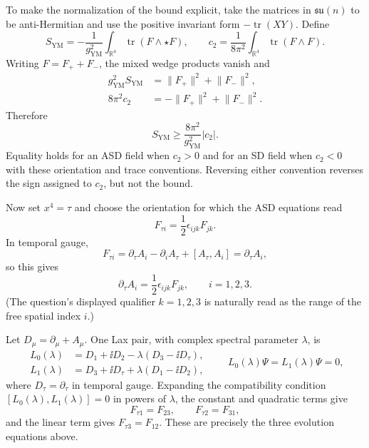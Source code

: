 \begin{enumerate}
  To make the normalization of the bound explicit, take the matrices in
  \(\mathfrak{su}(n)\) to be anti-Hermitian and use the positive
  invariant form \(-\operatorname{tr}(XY)\).  Define
  \[
    S_{\mathrm{YM}}
      =-\frac1{g_{\mathrm{YM}}^2}
        \int_{\mathbb R^4}\operatorname{tr}(F\wedge\star F),
    \qquad
    c_2=\frac1{8\pi^2}
        \int_{\mathbb R^4}\operatorname{tr}(F\wedge F).
  \]
  Writing \(F=F_++F_-\), the mixed wedge products vanish and
  \[
  \begin{split}
    g_{\mathrm{YM}}^2S_{\mathrm{YM}}
      &=\lVert F_+\rVert^2+\lVert F_-\rVert^2,\\
    8\pi^2c_2
      &=-\lVert F_+\rVert^2+\lVert F_-\rVert^2.
  \end{split}
  \]
  Therefore
  \[
    \boxed{S_{\mathrm{YM}}
      \geq\frac{8\pi^2}{g_{\mathrm{YM}}^2}|c_2|.}
  \]
  Equality holds for an ASD field when \(c_2>0\) and for an SD field
  when \(c_2<0\) with these orientation and trace conventions.  Reversing
  either convention reverses the sign assigned to \(c_2\), but not the
  bound.

  Now set \(x^4=\tau\) and choose the orientation for which the ASD
  equations read
  \[
    F_{\tau i}=\frac12\epsilon_{ijk}F_{jk}.
  \]
  In temporal gauge,
  \[
    F_{\tau i}=\partial_\tau A_i
      -\partial_iA_\tau+[A_\tau,A_i]
      =\partial_\tau A_i,
  \]
  so this gives
  \[
    \boxed{\partial_\tau A_i
      =\frac12\epsilon_{ijk}F_{jk},\qquad i=1,2,3.}
  \]
  (The question's displayed qualifier \(k=1,2,3\) is naturally read as
  the range of the free spatial index \(i\).)

  Let \(D_\mu=\partial_\mu+A_\mu\).  One Lax pair, with complex spectral
  parameter \(\lambda\), is
  \[
  \begin{split}
    L_0(\lambda)
      &=D_1+\ii D_2-\lambda(D_3-\ii D_\tau),\\
    L_1(\lambda)
      &=D_3+\ii D_\tau+\lambda(D_1-\ii D_2),
  \end{split}
  \qquad
    L_0(\lambda)\Psi=L_1(\lambda)\Psi=0,
  \]
  where \(D_\tau=\partial_\tau\) in temporal gauge.  Expanding the
  compatibility condition
  \([L_0(\lambda),L_1(\lambda)]=0\) in powers of \(\lambda\), the
  constant and quadratic terms give
  \[
    F_{\tau1}=F_{23},\qquad F_{\tau2}=F_{31},
  \]
  and the linear term gives \(F_{\tau3}=F_{12}\).  These are precisely
  the three evolution equations above.


\end{enumerate}
